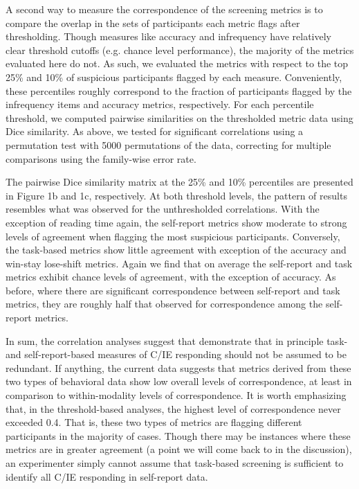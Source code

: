 \documentclass[a4paper,notitlepage,12pt]{article}
\begin{document}
A second way to measure the correspondence of the screening metrics is to compare the overlap in the sets of participants each metric flags after thresholding. Though measures like accuracy and infrequency have relatively clear threshold cutoffs (e.g. chance level performance), the majority of the metrics evaluated here do not. As such, we evaluated the metrics with respect to the top 25\% and 10\% of suspicious participants flagged by each measure. Conveniently, these percentiles roughly correspond to the fraction of participants flagged by the infrequency items and accuracy metrics, respectively. For each percentile threshold, we computed pairwise similarities on the thresholded metric data using Dice similarity. As above, we tested for significant correlations using a permutation test with 5000 permutations of the data, correcting for multiple comparisons using the family-wise error rate.

The pairwise Dice similarity matrix at the 25\% and 10\% percentiles are presented in Figure 1b and 1c, respectively. At both threshold levels, the pattern of results resembles what was observed for the unthresholded correlations. With the exception of reading time again, the self-report metrics show moderate to strong levels of agreement when flagging the most suspicious participants. Conversely, the task-based metrics show little agreement with exception of the accuracy and win-stay lose-shift metrics. Again we find that on average the self-report and task metrics exhibit chance levels of agreement, with the exception of accuracy. As before, where there are significant correspondence between self-report and task metrics, they are roughly half that observed for correspondence among the self-report metrics. 

In sum, the correlation analyses suggest that demonstrate that in principle task- and self-report-based measures of C/IE responding should not be assumed to be redundant. If anything, the current data suggests that metrics derived from these two types of behavioral data show low overall levels of correspondence, at least in comparison to within-modality levels of correspondence. It is worth emphasizing that, in the threshold-based analyses, the highest level of correspondence never exceeded 0.4. That is, these two types of metrics are flagging different participants in the majority of cases. Though there may be instances where these metrics are in greater agreement (a point we will come back to in the discussion), an experimenter simply cannot assume that task-based screening is sufficient to identify all C/IE responding in self-report data.
\end{document}
